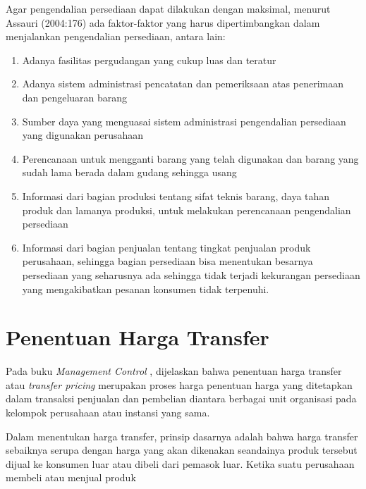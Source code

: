 Agar pengendalian persediaan dapat dilakukan dengan maksimal, menurut Assauri (2004:176) ada faktor-faktor yang harus dipertimbangkan dalam menjalankan pengendalian persediaan, antara lain:

\begin{enumerate}
	\item Adanya fasilitas pergudangan yang cukup luas dan teratur
	\item Adanya sistem administrasi pencatatan dan pemeriksaan atas penerimaan dan pengeluaran barang
	\item Sumber daya yang menguasai sistem administrasi pengendalian persediaan yang digunakan perusahaan
	\item Perencanaan untuk mengganti barang yang telah digunakan dan barang yang sudah lama berada dalam gudang sehingga usang
	\item Informasi dari bagian produksi tentang sifat teknis barang, daya tahan produk dan lamanya produksi, untuk melakukan perencanaan pengendalian persediaan
	\item Informasi dari bagian penjualan tentang tingkat penjualan produk perusahaan, sehingga bagian persediaan bisa menentukan besarnya persediaan yang seharusnya ada sehingga tidak terjadi kekurangan persediaan yang mengakibatkan pesanan konsumen tidak terpenuhi.
\end{enumerate}

\section{Penentuan Harga Transfer}

Pada buku \textit{Management Control} \citep{manajemencontrol}, dijelaskan bahwa penentuan harga transfer atau \textit{transfer pricing} merupakan proses harga penentuan harga yang ditetapkan dalam transaksi penjualan dan pembelian diantara berbagai unit organisasi pada kelompok perusahaan atau instansi yang sama.

Dalam menentukan harga transfer, prinsip dasarnya adalah bahwa harga transfer sebaiknya serupa dengan harga yang akan dikenakan seandainya produk tersebut dijual ke konsumen luar atau dibeli dari pemasok luar. Ketika suatu perusahaan membeli atau menjual produk


